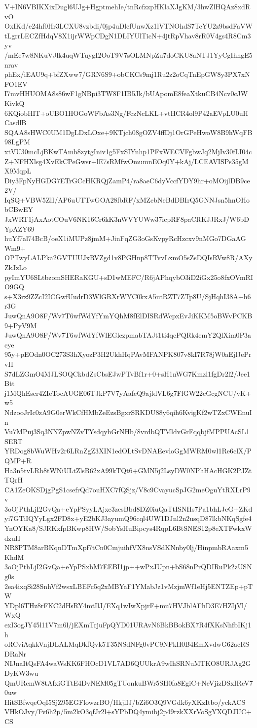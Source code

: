 V+IN6VBIKXixDugl6UJg+HgptmehIe/tnRcfzzpHKlaXJgKM/3hwZlHQAz8xdRvO
OxIKd/e24hf0Hr3LCXU8vzbdi/0jp4uDlcfUnwXz1lVTNOhdS7TcYU2z9bsdFaVW
tLgrrLECZfHdqV8X1ijrWWpCDgN1DLIYUlTicN+4jtRpVhav8rR0V4gs4R8Cm3yv
/mEe7w8NKuVJlk4uqWTuygI2OoT9V7sOLMNpZu7doCKU8aNTJ1YyCgIhhgE5nrav
phEx/iEAU9q+bfZXww7/GRN6S9+obCKCs9mj1Ru2z2oCqTnEpGW8y3PX7xNFO1EV
I7mvHHUOMA8s86wF1gNBpi3TW8F1IB5Jk/bUApomE8feaXtkuCB4Ncv0cJWKivkQ
6KQiobHIT+oUBO1HOGoWFbAs3Ng/FczNcLKL+vtHCR4ol9P42aEVpLU0uHCasdlB
SQAA8sHWC0UM1DgLDxLOxe+9KTjch08gOZV4ffDj1OrGPeHwoW8B9hWqFB98LgPM
xtVU30mcLjBKwTAmb8zytgIniv1g5FxSIYnhp1PFxWECVFgbwJq2MjIv30fLI04c
Z+NFHXlsg4XvEkCPeGwsr+lE7sRMfwOmumnEOq0Y+kAj/LCEAVISPs35gMX9MqpL
Diy3FpNyHGDG7ETrGCcHKRQjZamP4/ra8aeC6dyVccfYDY9hr+oMOijlDB9ce2V/
IqSQ+VBW5ZlI/AP6uUTTwGOA28fbRF/xMZcbNeBdDBIrQ5GNNJsn5hnOHobCBwEY
JxWRT1jAxAotCOuV6NK16Cr6kK3nWVYUWw37icpRF8paCRKJJRxJ/W6bDYpAZY69
huYf7al74BcB/oeX1iMUPz8jmM+JinFqZG3oGsKvpyRcHzcxv9nMGo7DGaAGWm9+
OPTwyLALPka2GVTUUJxRVZgd1v8PGHnp8TTvvLxmO5sZsDQIsRVw8R/AXyZkJzLo
pyImYU6SLtbzomSHERaKGU+sD1wMEFC/R6jAPhqybO3iD2iGx25o8fxOVmRIO9GQ
s+X3rz9ZZcI2ICGwfUudrD3WlGRXrWYC0kxA5utRZT7ZTp8U/SjHqhI38A+h6r3G
JuwQnA9O8F/Wv7T6wfWdYfYmYQhM8fElDISRdWcpxEvJiKKM5oBWvPCKB9+PyV9M
JuwQnA9O8F/Wv7T6wfWdYfWlEGlczpmabTAJt1ti4qcPQRk4emY2QlXim0P3acye
95y+pEOdn0OC273S3hXyozP3H2UkhHqPAvMFANPK807v8kI7R78jW0aEjlJePrvH
S7dLZGmO4MJLSOQCkbdZsCbsEJwPTvBf1r+0+sH1nWG7Kmzl1fgDr2l2/Jee1Btt
j1MQhEscr4ZIeTocAUGE06TJkP7V7yAafeQ9ajldVL6g7FlGW22cGcgNCU/vK+w5
NdzooJrIc0zA9G0erWkCfHMbZeEzsBgxrSRKDU88y6qih6KvigKf2wTZxCWEnuIn
Vu7MPuj3Sq3NNZpwNZvTYsdqyhGrNHb/8vrdbQTMldvGrFqqbjfMPPUAcSL1SERT
YRDog8bWuWHv2r6LRnZgZ3XIN1edOLtSvDNAEevloGgMWRM0wl1Re6clX/PQMP+R
Ha3n5tvLRb8tWNiULtZlsB62xA99kTQt6+GMN5j2LsyDW0NPhHAcHGK2PJZtTQrH
CA1ZeOKSDjgPgS1csefrQd7ouHXC7fQSjz/V8c9CvayucSpJG2meOguYtRXLrP9v
3oOjPthLjI2GvQa+eYpPSyyLAjxe3zesBbd8DZ0iuQaTtISNHs7Pa1bhLJcG+ZKd
yi7GTiIQYyLgx2FD8x+yE2bKJ3ayumQ96cql4UW1DJnl2n2usqD87lkbNKqSgfe4
YnOYKa8/SJRKxfpBKwp8HW/SobYsHuBipcys4RqpL6BtSNES12p8eXTFwkxWdzuH
NR8PTM8arBKqnDTmXpf7tCn0CmjuihfVX8nsVSdKNnby0lj/HinpmbRAaxm5KhdM
3oOjPthLjI2GvQa+eYpPSxbM7EEBI1jp++wPxJUpn+bS68nPrQDIRuPk2zUSNg0s
2ea4ixqSi28SnhVf2wsxLBEFc5q2xMBYaF1YMabJz1vMzjmWf1eHj5ENTZEp+pTW
YDpl6THz8rFKC2dHsRY4mtIlJ/EXq1wIwXpjrF+mu7HVJblAFhD3E7HZIjVl/WxQ
exI3ogJY45l11V7m6l/jEXmTrjuFpQYD01URAvN6BkBBokBX7R4fXKsNhfbIKj1h
oRCviAqkkVnjDLALMqDkfQvk5T35NSdNFg0vPC9NFkH0B4EmXvdwG62acRSDRaNr
NIJnaItQsFA4waWsKK6FHOcD1VL7AD6QUUkrA9wIhSRNuMTKO8URJAg2GDyKW3wu
QmURcmW8tAfxiGTtE4DvNEM05gTUonkuBWr5SH0fa8EgiC+NeVjizDSxIReV70uw
HitSBfwqeOqI5SjZ95EGFlowzrBO/HkjlIJ/bZi6O3Q9VGdk6yXKzItbo/yckACS
VHkOJvy/Fv6h2p/5m2kO3qfJr2l+sYPbDQ4ymibj2p49rzkXXrVoSgYXQDJUC+CS
